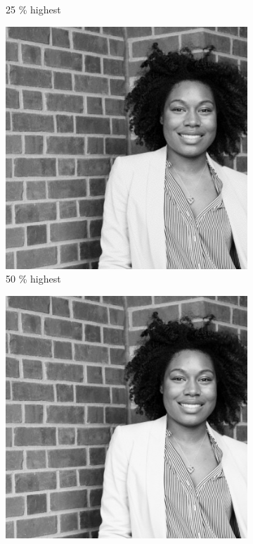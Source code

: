 \begin{figure}[h!]
\begin{subfigure}{0.2\textwidth}
  \caption{25 \% highest}
\end{subfigure}%
\begin{subfigure}{0.2\textwidth}
  \centering
  \includegraphics[width=0.95\linewidth]{output/magnitud_high_50}
  \caption{50 \% highest}
\end{subfigure}%
\begin{subfigure}{0.2\textwidth}
  \centering
  \includegraphics[width=0.95\linewidth]{output/magnitud_high_75}

\end{subfigure}
\end{figure}
